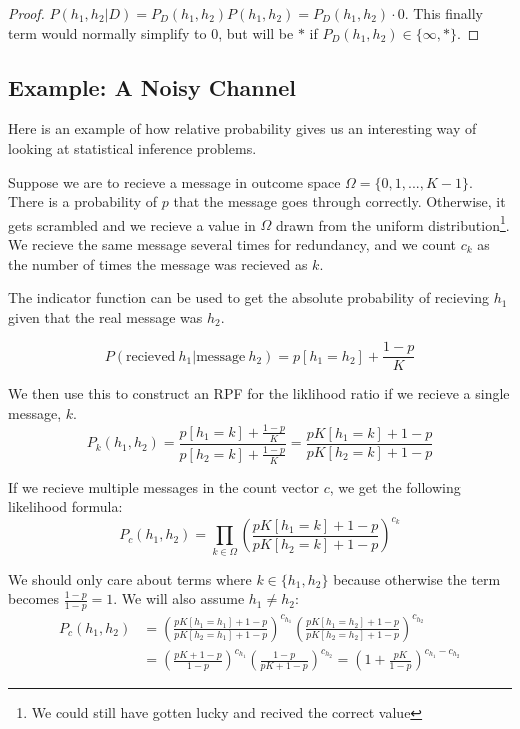 \documentclass[twoside]{article}
\theoremstyle{plain}%
\theoremstyle{definition}
\theoremstyle{remark}
\begin{document}
\begin{proof}
\(P(h_1, h_2|D) = P_D(h_1, h_2) P(h_1, h_2) = P_D(h_1, h_2) \cdot 0\). This finally term would normally simplify to 0, but will be \(\ast\) if \(P_D(h_1, h_2) \in \{\infty, \ast\}\).
\end{proof}

\subsection{Example: A Noisy Channel}

Here is an example of how relative probability gives us an interesting way of looking at statistical inference problems.

Suppose we are to recieve a message in outcome space \(\Omega = \{0, 1, ..., K-1\}\). There is a probability of \(p\) that the message goes through correctly. Otherwise, it gets scrambled and we recieve a value in \(\Omega\) drawn from the uniform distribution\footnote{We could still have gotten lucky and recived the correct value}. We recieve the same message several times for redundancy, and we count \(c_k\) as the number of times the message was recieved as \(k\).

The indicator function can be used to get the absolute probability of recieving \(h_1\) given that the real message was \(h_2\).

\[P(\text{recieved}\: h_1 | \text{message}\: h_2) = p[h_1 = h_2] + \frac{1-p}{K}\]
 
We then use this to construct an RPF for the liklihood ratio if we recieve a single message, \(k\).
\[P_k(h_1, h_2) = \frac{p[h_1 = k] + \frac{1-p}{K}}{p[h_2 = k] + \frac{1-p}{K}} = \frac{pK[h_1 = k] + 1-p}{pK[h_2 = k] + 1-p}\]

If we recieve multiple messages in the count vector \(c\), we get the following likelihood formula:
\[P_c(h_1, h_2) = \prod_{k \in \Omega}\left(\frac{pK[h_1 = k] + 1-p}{pK[h_2 = k] + 1-p}\right)^{c_k}\]

We should only care about terms where \(k \in \{h_1, h_2\}\) because otherwise the term becomes \(\frac{1-p}{1-p} = 1\). We will also assume \(h_1 \neq h_2\):
\begin{equation}
\begin{aligned}
P_c(h_1, h_2) &= \left(\frac{pK[h_1 = h_1] + 1-p}{pK[h_2 = h_1] + 1-p}\right)^{c_{h_1}} \left(\frac{pK[h_1 = h_2] + 1-p}{pK[h_2 = h_2] + 1-p}\right)^{c_{h_2}} \\
& = \left(\frac{pK + 1-p}{1-p}\right)^{c_{h_1}} \left(\frac{1-p}{pK + 1-p}\right)^{c_{h_2}} = \left(1 + \frac{pK}{1-p}\right)^{c_{h_1} - c_{h_2}}
\end{aligned}
\end{equation}
\end{document}
